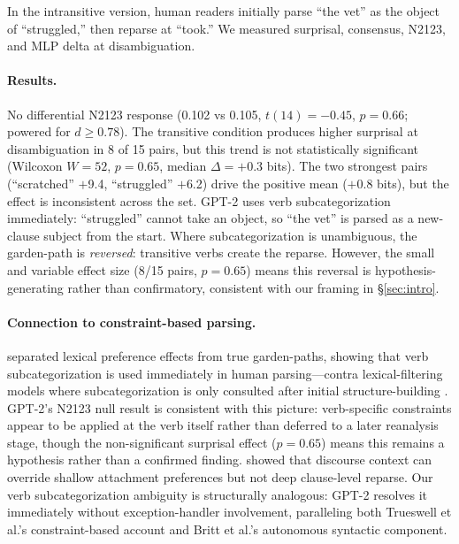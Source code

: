 \documentclass{article}
\begin{document}
In the intransitive version, human readers initially parse ``the vet'' as
the object of ``struggled,'' then reparse at ``took.''
We measured surprisal, consensus, N2123, and MLP delta at disambiguation.

\paragraph{Results.}
No differential N2123 response (0.102 vs 0.105, $t(14) = -0.45$, $p = 0.66$;
powered for $d \geq 0.78$).
The transitive condition produces higher surprisal at disambiguation
in 8 of 15 pairs, but this trend is not statistically significant
(Wilcoxon $W = 52$, $p = 0.65$, median $\Delta = +0.3$ bits).
The two strongest pairs (``scratched'' $+$9.4, ``struggled'' $+$6.2)
drive the positive mean ($+$0.8 bits), but the effect is inconsistent
across the set.
GPT-2 uses verb subcategorization immediately: ``struggled'' cannot take an
object, so ``the vet'' is parsed as a new-clause subject from the start.
Where subcategorization is unambiguous, the garden-path is
\emph{reversed}: transitive verbs create the reparse.
However, the small and variable effect size (8/15 pairs, $p = 0.65$)
means this reversal is hypothesis-generating rather than confirmatory,
consistent with our framing in \S\ref{sec:intro}.

\paragraph{Connection to constraint-based parsing.}
\citet{trueswell1993verb} separated lexical preference effects from true
garden-paths, showing that verb subcategorization is used immediately in human
parsing---contra lexical-filtering models where subcategorization is only
consulted after initial structure-building
\citep[see also][for related evidence on lexical mediation]{traxler2007lexical}.
GPT-2's N2123 null result is consistent with this picture: verb-specific
constraints appear to be applied at the verb itself rather than deferred to
a later reanalysis stage, though the non-significant surprisal effect
($p = 0.65$) means this remains a hypothesis rather than a confirmed finding.
\citet{britt1992parsing} showed that discourse context can override shallow
attachment preferences but not deep clause-level reparse. Our verb
subcategorization ambiguity is structurally analogous: GPT-2 resolves it
immediately without exception-handler involvement, paralleling both Trueswell
et al.'s constraint-based account and Britt et al.'s autonomous syntactic
component.
\end{document}
